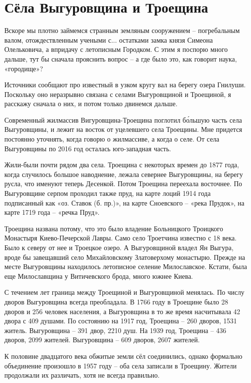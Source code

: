 \chapter{Сёла Выгуровщина и Троещина}

Вскоре мы плотно займемся странным земляным сооружением – погребальным валом, отождествленным учеными с... остатками замка  князя Симеона Олельковича, а впридачу с летописным Городком. С этим я поспорю много дальше, тут бы сначала прояснить вопрос – а где было это, как говорит наука, «городище»?

Источники сообщают про известный в узком кругу вал на берегу озера Гнилуши. Поскольку оно неразрывно связана с селами Выгуровщиной и Троещиной, я расскажу сначала о них, и потом только двинемся дальше.

Современный жилмассив Вигуровщина-Троещина поглотил б\'ольшую часть села Выгуровщины, и лежит на восток от уцелевшего села Троещины. Мне придется постоянно уточнять, когда говорю о жилмассиве, а когда о селе. От села Выгуровщины по 2016 год осталась юго-западная часть.

Жили-были почти рядом два села. Троещина с некоторых времен до 1877 года, когда случилось большое наводнение, лежала севернее Выгуровщины, на берегу русла, что именуют теперь Десенкой. Потом Троещина переехала восточнее. По Выгуровщине серпом проходил также пруд, на карте лоций 1914 года подписанный как «оз. Ставок (б. пр.)», на карте Сноевского – «река Прудок», на карте 1719 года – «речка Пруд». 

Троещина названа потому, что это было владение Больницкого Троицкого Монастыря Киево-Печерской Лавры. Само село Троетчина известно с 18 века. Было к северу от нее и Троецкое озеро. А Выгуровщиной владел Ян Выгура, вроде бы завещавший село Михайловскому Златоверхому монастырю. Прежде на месте Выгуровщины находилось летописное селение Милославское. Кстати, была еще Милославщина у Витичевского брода, много южнее Киева.

С течением лет граница между Троещиной и Выгуровщиной менялась. По числу дворов Выгуровщина всегда преобладала. В 1766 году в Троещине было 28 дворов и 256 человек населения, а Выгуровщина в то же время насчитывала 42 двора с 409 душами. По состоянию на 1917 год, Троещина – 260 дворов, 1531 житель. Выгуровщина – 391 двор, 2210 душ. На 1939 год, Троещина – 436 дворов, 2099 жителей. Выгуровщина – 609 дворов, 2607 жителей.

К половине двадцатого века обжитые земли сёл соединились, однако формально объединение произошло в 1957 году – оба села записали в Троещину. Жители продолжали их различать, хотя не всегда правильно.


